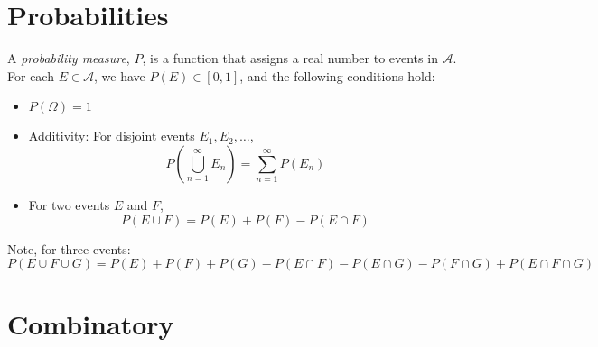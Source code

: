 \vspace{0.5cm}

\section{Probabilities}
A \textit{probability measure}, \(P\), is a function that assigns a real number to events in \(\mathcal{A}\). For each \(E \in \mathcal{A}\), we have \(P(E) \in [0, 1]\), and the following conditions hold:

\begin{itemize}
    \item \(P(\Omega) = 1\)
    \item Additivity: For disjoint events \(E_1, E_2, \dots\), 
    \[
    P\left( \bigcup_{n=1}^{\infty} E_n \right) = \sum_{n=1}^{\infty} P(E_n)
    \]
    \item For two events \(E\) and \(F\),
    \[
    P(E \cup F) = P(E) + P(F) - P(E \cap F)
    \]
\end{itemize}

\noindent Note, for three events:
\[
P(E \cup F \cup G) = P(E) + P(F) + P(G) - P(E \cap F) - P(E \cap G) - P(F \cap G) + P(E \cap F \cap G)
\]


\section{Combinatory}

